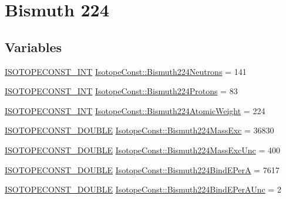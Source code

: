 \hypertarget{group___isotope_const-_bismuth-_bi224}{}\section{Bismuth 224}
\label{group___isotope_const-_bismuth-_bi224}
\subsection*{Variables}
\begin{DoxyCompactItemize}
\item 
\mbox{\hyperlink{group___isotope_const-_macros_ga5f18360b3e99483a35c32d789e62621c}{I\+S\+O\+T\+O\+P\+E\+C\+O\+N\+S\+T\+\_\+\+I\+NT}} \mbox{\hyperlink{group___isotope_const-_bismuth-_bi224_ga52dd899262ea578210c1a113b97a225d}{Isotope\+Const\+::\+Bismuth224\+Neutrons}} = 141
\item 
\mbox{\hyperlink{group___isotope_const-_macros_ga5f18360b3e99483a35c32d789e62621c}{I\+S\+O\+T\+O\+P\+E\+C\+O\+N\+S\+T\+\_\+\+I\+NT}} \mbox{\hyperlink{group___isotope_const-_bismuth-_bi224_ga5857c234b688566f7fd46b64722d6e75}{Isotope\+Const\+::\+Bismuth224\+Protons}} = 83
\item 
\mbox{\hyperlink{group___isotope_const-_macros_ga5f18360b3e99483a35c32d789e62621c}{I\+S\+O\+T\+O\+P\+E\+C\+O\+N\+S\+T\+\_\+\+I\+NT}} \mbox{\hyperlink{group___isotope_const-_bismuth-_bi224_gaff31f14100383733a32de90a12f86295}{Isotope\+Const\+::\+Bismuth224\+Atomic\+Weight}} = 224
\item 
\mbox{\hyperlink{group___isotope_const-_macros_ga8f45a7272ce02c0b4c65c44636ed719a}{I\+S\+O\+T\+O\+P\+E\+C\+O\+N\+S\+T\+\_\+\+D\+O\+U\+B\+LE}} \mbox{\hyperlink{group___isotope_const-_bismuth-_bi224_gae73bd0d048c0111658a3f359763843a2}{Isotope\+Const\+::\+Bismuth224\+Mass\+Exc}} = 36830
\item 
\mbox{\hyperlink{group___isotope_const-_macros_ga8f45a7272ce02c0b4c65c44636ed719a}{I\+S\+O\+T\+O\+P\+E\+C\+O\+N\+S\+T\+\_\+\+D\+O\+U\+B\+LE}} \mbox{\hyperlink{group___isotope_const-_bismuth-_bi224_ga706d82b2f8ee0664feeffbf7bb3144dc}{Isotope\+Const\+::\+Bismuth224\+Mass\+Exc\+Unc}} = 400
\item 
\mbox{\hyperlink{group___isotope_const-_macros_ga8f45a7272ce02c0b4c65c44636ed719a}{I\+S\+O\+T\+O\+P\+E\+C\+O\+N\+S\+T\+\_\+\+D\+O\+U\+B\+LE}} \mbox{\hyperlink{group___isotope_const-_bismuth-_bi224_ga0964cc2c1beb5add0fd8b21eb7a3f43a}{Isotope\+Const\+::\+Bismuth224\+Bind\+E\+PerA}} = 7617
\item 
\mbox{\hyperlink{group___isotope_const-_macros_ga8f45a7272ce02c0b4c65c44636ed719a}{I\+S\+O\+T\+O\+P\+E\+C\+O\+N\+S\+T\+\_\+\+D\+O\+U\+B\+LE}} \mbox{\hyperlink{group___isotope_const-_bismuth-_bi224_ga3ed7291c1d195d13f3521cd1684fc89f}{Isotope\+Const\+::\+Bismuth224\+Bind\+E\+Per\+A\+Unc}} = 2

\end{DoxyCompactItemize}
